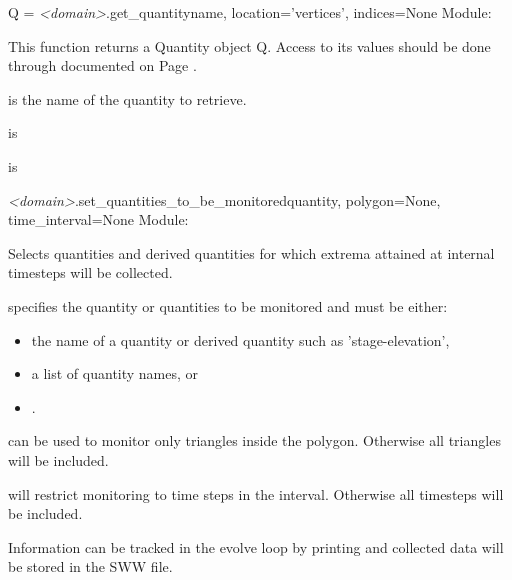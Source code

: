 \documentclass{manual}
\begin{document}
\begin{methoddesc}{Q = \emph{<domain>}.get_quantity}{name,
                                               location='vertices',
                                               indices=None}
Module: 

This function returns a Quantity object Q.
Access to its values should be done through  documented on Page \pageref{pg:get values}.

 is the name of the quantity to retrieve.

 is

 is
\end{methoddesc}

\begin{methoddesc}{\emph{<domain>}.set_quantities_to_be_monitored}{quantity,
                                             polygon=None,
                                             time_interval=None}
Module: 

Selects quantities and derived quantities for which extrema attained at internal timesteps
will be collected.

 specifies the quantity or quantities to be monitored and must be either:
\begin{itemize}
  \item the name of a quantity or derived quantity such as 'stage-elevation',
  \item a list of quantity names, or
  \item {}.
\end{itemize}

 can be used to monitor only triangles inside the polygon. Otherwise
all triangles will be included.

 will restrict monitoring to time steps in the interval. Otherwise
all timesteps will be included.

Information can be tracked in the evolve loop by printing  and
collected data will be stored in the SWW file.
\end{methoddesc}
\end{document}

